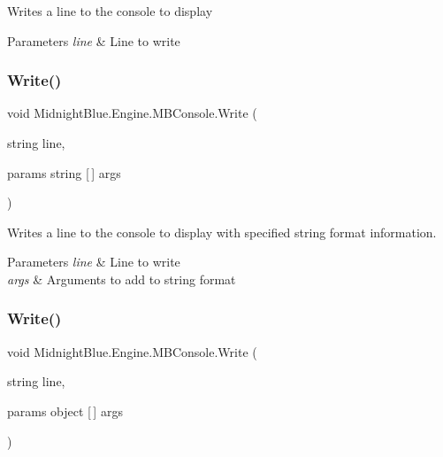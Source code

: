 Writes a line to the console to display 


\begin{DoxyParams}{Parameters}
{\em line} & Line to write\\
\hline
\end{DoxyParams}
\hypertarget{class_midnight_blue_1_1_engine_1_1_m_b_console_af2f6965b500048bb867b822ce99006fe}{}\label{class_midnight_blue_1_1_engine_1_1_m_b_console_af2f6965b500048bb867b822ce99006fe} 
\subsubsection{\texorpdfstring{Write()}{Write()}\hspace{0.1cm}{\footnotesize\ttfamily [2/3]}}
{\footnotesize\ttfamily void Midnight\+Blue.\+Engine.\+M\+B\+Console.\+Write (\begin{DoxyParamCaption}\item[{string}]{line,  }\item[{params string \mbox{[}$\,$\mbox{]}}]{args }\end{DoxyParamCaption})\hspace{0.3cm}{\ttfamily [inline]}}



Writes a line to the console to display with specified string format information. 


\begin{DoxyParams}{Parameters}
{\em line} & Line to write\\
\hline
{\em args} & Arguments to add to string format\\
\hline
\end{DoxyParams}
\hypertarget{class_midnight_blue_1_1_engine_1_1_m_b_console_a1c6f02e42d8c57e933cebf6022ec3389}{}\label{class_midnight_blue_1_1_engine_1_1_m_b_console_a1c6f02e42d8c57e933cebf6022ec3389} 
\subsubsection{\texorpdfstring{Write()}{Write()}\hspace{0.1cm}{\footnotesize\ttfamily [3/3]}}
{\footnotesize\ttfamily void Midnight\+Blue.\+Engine.\+M\+B\+Console.\+Write (\begin{DoxyParamCaption}\item[{string}]{line,  }\item[{params object \mbox{[}$\,$\mbox{]}}]{args }\end{DoxyParamCaption})\hspace{0.3cm}{\ttfamily [inline]}}



